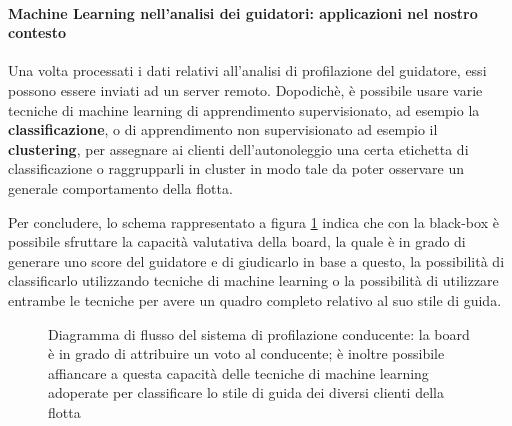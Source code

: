 \documentclass[12pt, a4paper, italian]{report}
\numberwithin{figure}{chapter}
\numberwithin{table}{chapter}
\begin{document}
\vspace{0.5cm}

\paragraph{Machine Learning nell'analisi dei guidatori: applicazioni nel nostro contesto}
Una volta processati i dati relativi all'analisi di profilazione del guidatore, essi possono essere inviati ad un server remoto. Dopodichè, è possibile usare varie tecniche di machine learning di apprendimento supervisionato, ad esempio la \textbf{classificazione}, o di apprendimento non supervisionato ad esempio il \textbf{clustering}, per assegnare ai clienti dell'autonoleggio una certa etichetta di classificazione o raggrupparli in cluster in modo tale da poter osservare un generale comportamento della flotta.

\newpage

Per concludere, lo schema rappresentato a figura \ref{fig:ProfilazioneML} indica che con la black-box è possibile sfruttare la capacità valutativa della board, la quale è in grado di generare uno score del guidatore e di giudicarlo in base a questo, la possibilità di classificarlo utilizzando tecniche di machine learning o la possibilità di utilizzare entrambe le tecniche per avere un quadro completo relativo al suo stile di guida.

\vspace{0.5cm}

\begin{figure}[h]
\centering
{} %
\caption{Diagramma di flusso del sistema di profilazione conducente: la board è in grado di attribuire un voto al conducente; è inoltre possibile affiancare a questa capacità delle tecniche di machine learning adoperate per classificare lo stile di guida dei diversi clienti della flotta}
\label{fig:ProfilazioneML}
\end{figure}
\end{document}

